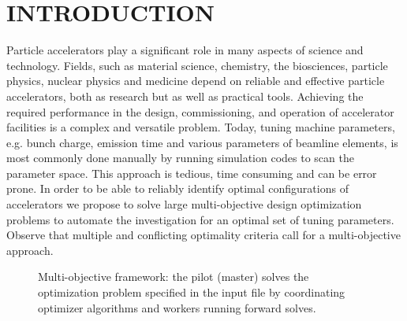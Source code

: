 \documentclass[%
reprint,
amsmath,amssymb,
aps,
prstab,
]{revtex4-1}
\begin{document}
\maketitle


\section{INTRODUCTION} \label{sec:introduction}

Particle accelerators play a significant role in many aspects of science and
  technology.
Fields, such as material science, chemistry, the biosciences, particle
  physics, nuclear physics and medicine depend on reliable and effective
  particle accelerators, both as research but as well as practical tools.
Achieving the required performance in the design, commissioning, and operation
  of accelerator facilities is a complex and versatile problem.
Today, tuning machine parameters, e.g. bunch charge, emission time and
  various parameters of beamline elements, is most commonly done manually by
  running simulation codes to scan the parameter space.
This approach is tedious, time consuming and can be error prone.
In order to be able to reliably identify optimal configurations of
  accelerators we propose to solve large multi-objective design optimization
  problems to automate the investigation for an optimal set of tuning
  parameters.
Observe that multiple and conflicting optimality criteria call for a
  multi-objective approach.

\begin{figure}%
	\scalebox{0.8}{
	\pgfdeclarelayer{background}
	\pgfsetlayers{background,main}
	\begin{tikzpicture}[text=black]%
	
	\end{tikzpicture}
}
\caption{Multi-objective framework: the pilot (master) solves the
	optimization problem specified in the input file by coordinating optimizer
	algorithms and workers running forward solves.}
\label{fig:framenetwork}
\end{figure}
\end{document}
